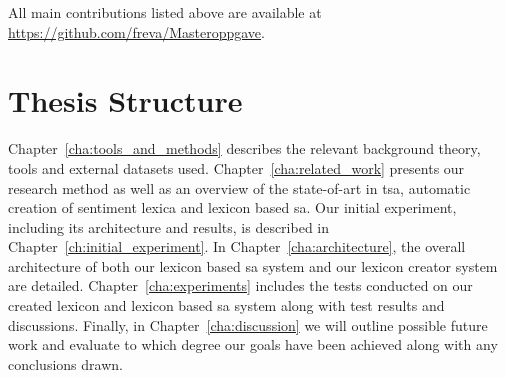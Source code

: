  \noindent
 All main contributions listed above are available at \\
 \noindent \url{https://github.com/freva/Masteroppgave}.


\section{Thesis Structure}
Chapter~\ref{cha:tools_and_methods} describes the relevant background theory, tools and external datasets used. Chapter~\ref{cha:related_work} presents our research method as well as an overview of the state-of-art in \ac{tsa}, automatic creation of sentiment lexica and lexicon based \ac{sa}. Our initial experiment, including its architecture and results, is described in Chapter~\ref{ch:initial_experiment}. In Chapter~\ref{cha:architecture}, the overall architecture of both our lexicon based \ac{sa} system and our lexicon creator system are detailed. Chapter~\ref{cha:experiments} includes the tests conducted on our created lexicon and lexicon based \ac{sa} system along with test results and discussions. Finally, in Chapter~\ref{cha:discussion} we will outline possible future work and evaluate to which degree our goals have been achieved along with any conclusions drawn.

\glsresetall